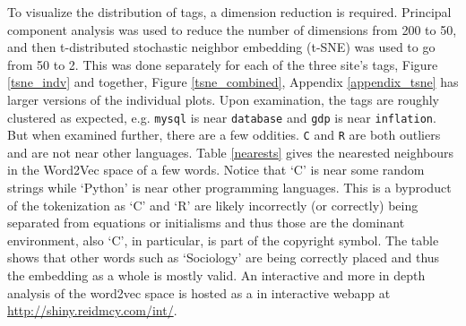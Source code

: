 \documentclass[12pt, a4paper]{article}
\begin{document}
To visualize the distribution of tags, a dimension reduction is required. Principal component analysis was used to reduce the number of dimensions from 200 to 50, and then t-distributed stochastic neighbor embedding (t-SNE) \citep{maaten2008visualizing} was used to go from 50 to 2. This was done separately for each of the three site's tags, Figure \ref{tsne_indv} and together, Figure \ref{tsne_combined}, Appendix \ref{appendix_tsne} has larger versions of the individual plots. Upon examination, the tags are roughly clustered as expected, e.g. \texttt{mysql} is near \texttt{database} and \texttt{gdp} is near \texttt{inflation}. But when examined further, there are a few oddities. \texttt{C} and \texttt{R} are both outliers and are not near other languages. Table \ref{nearests} gives the nearested neighbours in the Word2Vec space of a few words. Notice that `C' is near some random strings while `Python' is near other programming languages. This is a byproduct of the tokenization as `C' and `R' are likely incorrectly (or correctly) being separated from equations or initialisms and thus those are the dominant environment, also `C', in particular, is part of the copyright symbol. The table shows that other words such as `Sociology' are being correctly placed and thus the embedding as a whole is mostly valid. An interactive and more in depth analysis of the word2vec space is hosted as a in interactive webapp at \href{http://shiny.reidmcy.com/int/}{http://shiny.reidmcy.com/int/}.
\end{document}
